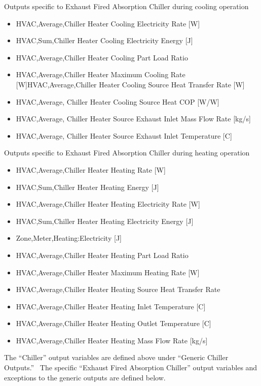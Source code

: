 Outputs specific to Exhaust Fired Absorption Chiller during cooling operation

\begin{itemize}
\item
  HVAC,Average,Chiller Heater Cooling Electricity Rate {[}W{]}
\item
  HVAC,Sum,Chiller Heater Cooling Electricity Energy {[}J{]}
\item
  HVAC,Average,Chiller Heater Cooling Part Load Ratio
\item
  HVAC,Average,Chiller Heater Maximum Cooling Rate {[}W{]}HVAC,Average,Chiller Heater Cooling Source Heat Transfer Rate {[}W{]}
\item
  HVAC,Average, Chiller Heater Cooling Source Heat COP {[}W/W{]}
\item
  HVAC,Average, Chiller Heater Source Exhaust Inlet Mass Flow Rate {[}kg/s{]}
\item
  HVAC,Average, Chiller Heater Source Exhaust Inlet Temperature {[}C{]}
\end{itemize}

Outputs specific to Exhaust Fired Absorption Chiller during heating operation

\begin{itemize}
\item
  HVAC,Average,Chiller Heater Heating Rate {[}W{]}
\item
  HVAC,Sum,Chiller Heater Heating Energy {[}J{]}
\item
  HVAC,Average,Chiller Heater Heating Electricity Rate {[}W{]}
\item
  HVAC,Sum,Chiller Heater Heating Electricity Energy {[}J{]}
\item
  Zone,Meter,Heating:Electricity {[}J{]}
\item
  HVAC,Average,Chiller Heater Heating Part Load Ratio
\item
  HVAC,Average,Chiller Heater Maximum Heating Rate {[}W{]}
\item
  HVAC,Average,Chiller Heater Heating Source Heat Transfer Rate
\item
  HVAC,Average,Chiller Heater Heating Inlet Temperature {[}C{]}
\item
  HVAC,Average,Chiller Heater Heating Outlet Temperature {[}C{]}
\item
  HVAC,Average,Chiller Heater Heating Mass Flow Rate {[}kg/s{]}
\end{itemize}

The ``Chiller'' output variables are defined above under ``Generic Chiller Outputs.''~ The specific ``Exhaust Fired Absorption Chiller'' output variables and exceptions to the generic outputs are defined below.

